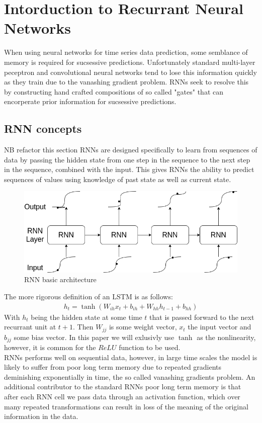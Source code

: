 \documentclass{article}
\begin{document}
\section{Intorduction to Recurrant Neural Networks}
\label{sec:intoRNNs}
When using neural networks for time series data prediction, some semblance of memory is required for sucsessive predictions. Unfortunately standard multi-layer peceptron and convolutional neural networks tend to lose this information quickly as they train due to the vanashing gradient problem. RNNs seek to resolve this by constructing hand crafted compositions of so called "gates" that can encorperate prior information for sucsessive predictions. 

\subsection{RNN concepts}
\label{sec:RNNS}
NB refactor this section
RNNs are designed specifically to learn from sequences of data by passing the hidden state from one step in the sequence to the next step in the sequence, combined with the input. This gives RNNs the ability to predict sequences of values using knowledge of past state as well as current state. 
\begin{figure}[H]
\caption{RNN basic architecture}
\label{fig:RNN}
\includegraphics[scale=0.5]{RNN.png}
\end{figure}
The more rigorous definition of an LSTM is as follows:
\begin{align*}
h_t = \tanh\left( W_{ih}x_t + b_{ih} + W_{hh}h_{t-1} + b_{hh}  \right)
\end{align*}
With $h_t$ being the hidden state at some time $t$ that is passed forward to the next recurrant unit at $t+1$. Then $W_{jj}$ is some weight vector, $x_t$ the input vector and $b_{jj}$ some bias vector. In this paper we will exlusivly use $\tanh$ as the nonlinearity, however, it is common for the $ReLU$ function to be used. \\
RNNs performs well on sequential data, however, in large time scales the model is likely to suffer from poor long term memory due to repeated gradients deminishing exponentially in time, the so called vanashing gradients problem. An additional contributor to the standard RNNs poor long term memory is that after each RNN cell we pass data through an activation function, which over many repeated transformations can result in loss of the meaning of the original information in the data. 
\end{document}
